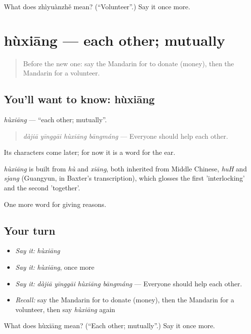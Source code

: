 \begin{tcolorbox}[breakable,colback=teal!4,colframe=teal!35!black,title={Before you move on}]
What does zhìyuànzhě mean? (\textquotedblleft{}Volunteer\textquotedblright{}.) Say it once more.
\end{tcolorbox}
\section[hùxiāng]{hùxiāng — each other; mutually}

\label{lesson:ZH-C375-huxiang}



\begin{quote}
Before the new one: say the Mandarin for to donate (money), then the Mandarin for a volunteer.
\end{quote}

\subsection*{You'll want to know: hùxiāng}
\emph{hùxiāng} — \textquotedblleft{}each other; mutually\textquotedblright{}.

\begin{quote}
\emph{dàjiā yīnggāi hùxiāng bāngmáng} — Everyone should help each other.
\end{quote}

Its characters come later; for now it is a word for the ear.

\begin{cousinweb}
\emph{hùxiāng} is built from \emph{hù} and \emph{xiāng}, both inherited from Middle Chinese, \emph{huH} and \emph{sjang} (Guangyun, in Baxter's transcription), which glosses the first 'interlocking' and the second 'together'.
\end{cousinweb}

\begin{grammarlens}[title={What you've built}]
One more word for giving reasons.
\end{grammarlens}

\subsection*{Your turn}
\begin{itemize}
\raggedright
  \item \emph{Say it:} \emph{hùxiāng}
  \item \emph{Say it:} \emph{hùxiāng}, once more
  \item \emph{Say it:} \emph{dàjiā yīnggāi hùxiāng bāngmáng} — Everyone should help each other.
  \item \emph{Recall:} say the Mandarin for to donate (money), then the Mandarin for a volunteer, then say \emph{hùxiāng} again
\end{itemize}

\begin{tcolorbox}[breakable,colback=teal!4,colframe=teal!35!black,title={Before you move on}]
What does hùxiāng mean? (\textquotedblleft{}Each other; mutually\textquotedblright{}.) Say it once more.
\end{tcolorbox}
